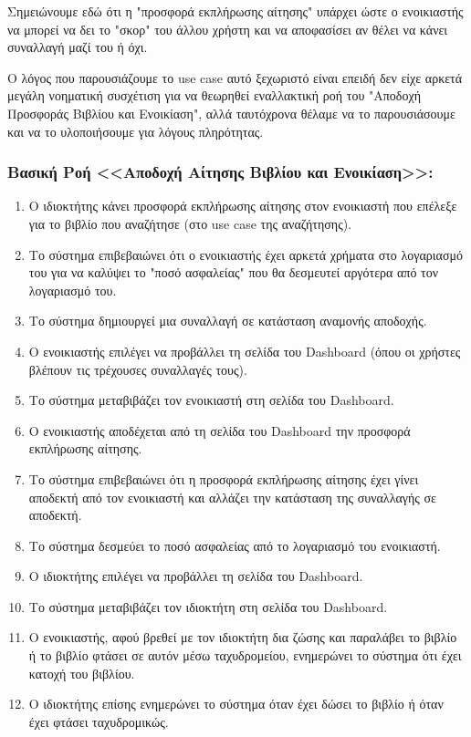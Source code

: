 \documentclass[12pt,a4paper]{article}
\begin{document}
Σημειώνουμε εδώ ότι η "προσφορά εκπλήρωσης αίτησης" υπάρχει ώστε ο ενοικιαστής να μπορεί να δει το "σκορ" του άλλου χρήστη και να αποφασίσει αν θέλει να κάνει συναλλαγή μαζί του ή όχι.

Ο λόγος που παρουσιάζουμε το use case αυτό ξεχωριστό είναι επειδή δεν είχε αρκετά μεγάλη νοηματική συσχέτιση για να θεωρηθεί εναλλακτική ροή του "Αποδοχή Προσφοράς Βιβλίου και Ενοικίαση", αλλά ταυτόχρονα θέλαμε να το παρουσιάσουμε και να το υλοποιήσουμε για λόγους πληρότητας.

\subsubsection*{Βασική Ροή <<Αποδοχή Αίτησης Βιβλίου και Ενοικίαση>>:}
\begin{enumerate}
    \item Ο ιδιοκτήτης κάνει προσφορά εκπλήρωσης αίτησης στον ενοικιαστή που επέλεξε για το βιβλίο που αναζήτησε (στο use case της αναζήτησης).
    \item Το σύστημα επιβεβαιώνει ότι ο ενοικιαστής έχει αρκετά χρήματα στο λογαριασμό του για να καλύψει το "ποσό ασφαλείας" που θα δεσμευτεί αργότερα από τον λογαριασμό του.
    \item Το σύστημα δημιουργεί μια συναλλαγή σε κατάσταση αναμονής αποδοχής.
    \item Ο ενοικιαστής επιλέγει να προβάλλει τη σελίδα του Dashboard (όπου οι χρήστες βλέπουν τις τρέχουσες συναλλαγές τους).
    \item Το σύστημα μεταβιβάζει τον ενοικιαστή στη σελίδα του Dashboard.
    \item Ο ενοικιαστής αποδέχεται από τη σελίδα του Dashboard την προσφορά εκπλήρωσης αίτησης.
    \item Το σύστημα επιβεβαιώνει ότι η προσφορά εκπλήρωσης αίτησης έχει γίνει αποδεκτή από τον ενοικιαστή και αλλάζει την κατάσταση της συναλλαγής σε αποδεκτή.
    \item Το σύστημα δεσμεύει το ποσό ασφαλείας από το λογαριασμό του ενοικιαστή.
    \item Ο ιδιοκτήτης επιλέγει να προβάλλει τη σελίδα του Dashboard.
    \item Το σύστημα μεταβιβάζει τον ιδιοκτήτη στη σελίδα του Dashboard.
    \item Ο ενοικιαστής, αφού βρεθεί με τον ιδιοκτήτη δια ζώσης και παραλάβει το βιβλίο ή το βιβλίο φτάσει σε αυτόν μέσω ταχυδρομείου, ενημερώνει το σύστημα ότι έχει κατοχή του βιβλίου. 
    \item Ο ιδιοκτήτης επίσης ενημερώνει το σύστημα όταν έχει δώσει το βιβλίο ή όταν έχει φτάσει ταχυδρομικώς.

\end{enumerate}
\end{document}
